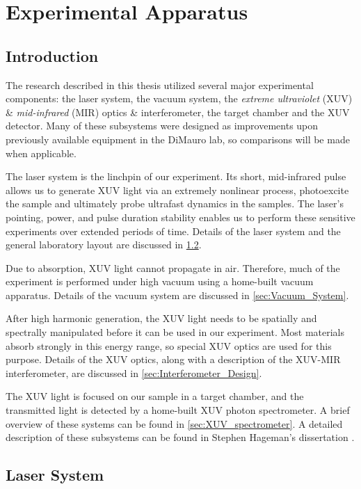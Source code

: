 \chapter{Experimental Apparatus}
\label{chap:Experimental_Apparatus}

\section{Introduction}

The research described in this thesis utilized several major experimental components: the laser system, the vacuum system, the \textit{extreme ultraviolet} (XUV) \& \textit{mid-infrared} (MIR) optics \& interferometer, the target chamber and the XUV detector. Many of these subsystems were designed as improvements upon previously available equipment in the DiMauro lab, so comparisons will be made when applicable.

The laser system is the linchpin of our experiment. Its short, mid-infrared pulse allows us to generate XUV light via an extremely nonlinear process, photoexcite the sample and ultimately probe ultrafast dynamics in the samples. The laser's pointing, power, and pulse duration stability enables us to perform these sensitive experiments over extended periods of time. Details of the laser system and the general laboratory layout are discussed in \cref{sec:Laser_System}.

Due to absorption, XUV light cannot propagate in air. Therefore, much of the experiment is performed under high vacuum using a home-built vacuum apparatus. Details of the vacuum system are discussed in \cref{sec:Vacuum_System}.

After high harmonic generation, the XUV light needs to be spatially and spectrally manipulated before it can be used in our experiment. Most materials absorb strongly in this energy range, so special XUV optics are used for this purpose. Details of the XUV optics, along with a description of the XUV-MIR interferometer, are discussed in \cref{sec:Interferometer_Design}. 

The XUV light is focused on our sample in a target chamber, and the transmitted light is detected by a home-built XUV photon spectrometer. A brief overview of these systems can be found in \cref{sec:XUV_spectrometer}. A detailed description of these subsystems can be found in Stephen Hageman's dissertation \cite{hagemanComplexAttosecondTransient2020}.


\section{Laser System}
\label{sec:Laser_System}

